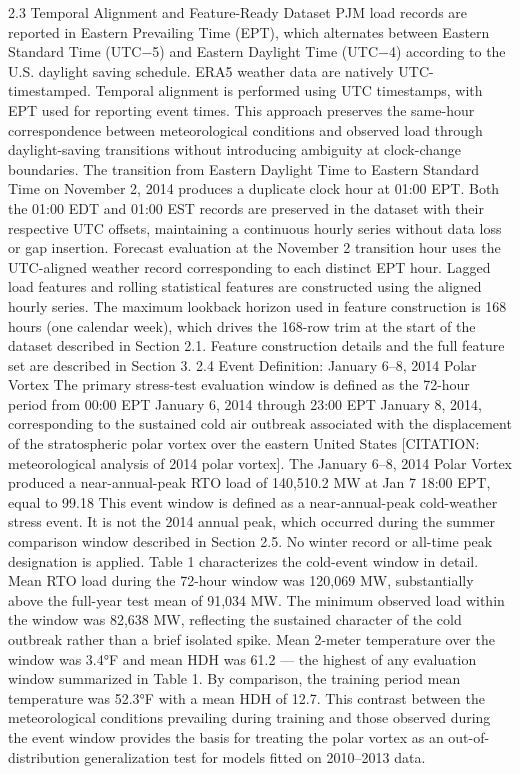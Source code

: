 2.3 Temporal Alignment and Feature-Ready Dataset
PJM load records are reported in Eastern Prevailing Time (EPT), which alternates between Eastern Standard Time (UTC−5) and Eastern Daylight Time (UTC−4) according to the U.S. daylight saving schedule. ERA5 weather data are natively UTC-timestamped. Temporal alignment is performed using UTC timestamps, with EPT used for reporting event times. This approach preserves the same-hour correspondence between meteorological conditions and observed load through daylight-saving transitions without introducing ambiguity at clock-change boundaries.
The transition from Eastern Daylight Time to Eastern Standard Time on November 2, 2014 produces a duplicate clock hour at 01:00 EPT. Both the 01:00 EDT and 01:00 EST records are preserved in the dataset with their respective UTC offsets, maintaining a continuous hourly series without data loss or gap insertion. Forecast evaluation at the November 2 transition hour uses the UTC-aligned weather record corresponding to each distinct EPT hour.
Lagged load features and rolling statistical features are constructed using the aligned hourly series. The maximum lookback horizon used in feature construction is 168 hours (one calendar week), which drives the 168-row trim at the start of the dataset described in Section 2.1. Feature construction details and the full feature set are described in Section 3.
2.4 Event Definition: January 6–8, 2014 Polar Vortex
The primary stress-test evaluation window is defined as the 72-hour period from 00:00 EPT January 6, 2014 through 23:00 EPT January 8, 2014, corresponding to the sustained cold air outbreak associated with the displacement of the stratospheric polar vortex over the eastern United States [CITATION: meteorological analysis of 2014 polar vortex]. The January 6–8, 2014 Polar Vortex produced a near-annual-peak RTO load of 140,510.2 MW at Jan 7 18:00 EPT, equal to 99.18%
This event window is defined as a near-annual-peak cold-weather stress event. It is not the 2014 annual peak, which occurred during the summer comparison window described in Section 2.5. No winter record or all-time peak designation is applied.
Table 1 characterizes the cold-event window in detail. Mean RTO load during the 72-hour window was 120,069 MW, substantially above the full-year test mean of 91,034 MW. The minimum observed load within the window was 82,638 MW, reflecting the sustained character of the cold outbreak rather than a brief isolated spike. Mean 2-meter temperature over the window was 3.4°F and mean HDH was 61.2 — the highest of any evaluation window summarized in Table 1. By comparison, the training period mean temperature was 52.3°F with a mean HDH of 12.7. This contrast between the meteorological conditions prevailing during training and those observed during the event window provides the basis for treating the polar vortex as an out-of-distribution generalization test for models fitted on 2010–2013 data.
